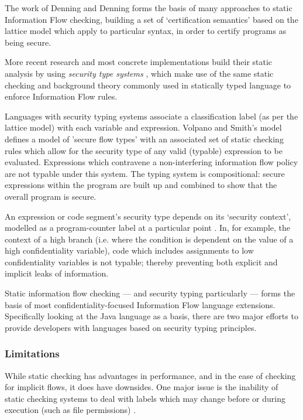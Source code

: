 The work of Denning and Denning \cite{denning1977if} forms the basis of many approaches to static Information Flow checking, building a set of `certification semantics' based on the lattice model which apply to particular syntax, in order to certify programs as being secure.

More recent research and most concrete implementations build their static analysis by using \textit{security type systems} \cite{sabelfeld2003if}, which make use of the same static checking and background theory commonly used in statically typed language to enforce Information Flow rules.

Languages with security typing systems associate a classification label (as per the lattice model) with each variable and expression. Volpano and Smith's model \cite{volpano1996sectype} defines a model of 'secure flow types' with an associated set of static checking rules which allow for the security type of any valid (typable) expression to be evaluated. Expressions which contravene a non-interfering information flow policy are not typable under this system. The typing system is compositional: secure expressions within the program are built up and combined to show that the overall program is secure.

An expression or code segment's security type depends on its `security context', modelled as a program-counter label at a particular point \cite{sabelfeld2003if}. In, for example, the context of a high branch (i.e. where the condition is dependent on the value of a high confidentiality variable), code which includes assignments to low confidentiality variables is not typable; thereby preventing both explicit and implicit leaks of information.

Static information flow checking --- and security typing particularly --- forms the basis of most confidentiality-focused Information Flow language extensions. Specifically looking at the Java language as a basis, there are two major efforts to provide developers with languages based on security typing principles.

\subsubsection{Limitations}

While static checking has advantages in performance, and in the ease of checking for implicit flows, it does have downsides. One major issue is the inability of static checking systems to deal with labels which may change before or during execution (such as file permissions) \cite{sabelfeld2003if}.

